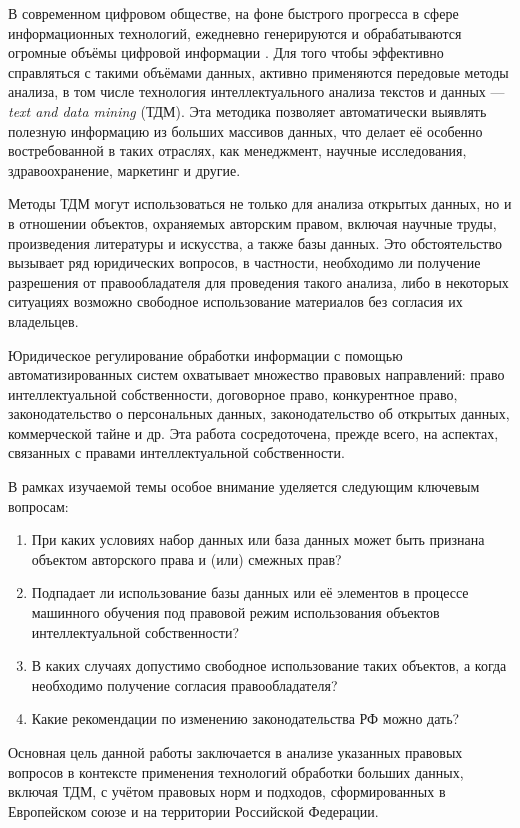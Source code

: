 \introduction

В современном цифровом обществе, на фоне быстрого прогресса в сфере
информационных технологий, ежедневно генерируются и обрабатываются огромные
объёмы цифровой информации \cite{geiger2020tdm}. Для того чтобы эффективно
справляться с такими объёмами данных, активно применяются передовые методы
анализа, в том числе технология интеллектуального анализа текстов и данных ---
\textit{text and data mining} (ТДМ). Эта методика позволяет автоматически
выявлять полезную информацию из больших массивов данных, что делает её особенно
востребованной в таких отраслях, как менеджмент, научные исследования,
здравоохранение, маркетинг и другие.

Методы ТДМ могут использоваться не только для анализа открытых данных, но и в
отношении объектов, охраняемых авторским правом, включая научные труды,
произведения литературы и искусства, а также базы данных. Это обстоятельство
вызывает ряд юридических вопросов, в частности, необходимо ли получение
разрешения от правообладателя для проведения такого анализа, либо в некоторых
ситуациях возможно свободное использование материалов без согласия их
владельцев.

Юридическое регулирование обработки информации с помощью автоматизированных
систем охватывает множество правовых направлений: право интеллектуальной
собственности, договорное право, конкурентное право, законодательство о
персональных данных, законодательство об открытых данных, коммерческой тайне и
др. Эта работа сосредоточена, прежде всего, на аспектах, связанных с правами
интеллектуальной собственности.

В рамках изучаемой темы особое внимание уделяется следующим ключевым вопросам:
\begin{enumerate}
    \item При каких условиях набор данных или база данных может быть признана
          объектом авторского права и (или) смежных прав?
    \item Подпадает ли использование базы данных или её элементов в процессе
          машинного обучения под правовой режим использования объектов
          интеллектуальной собственности?
    \item В каких случаях допустимо свободное использование таких объектов, а
          когда необходимо получение согласия правообладателя?
    \item Какие рекомендации по изменению законодательства РФ можно дать?
\end{enumerate}

Основная цель данной работы заключается в анализе указанных правовых вопросов в
контексте применения технологий обработки больших данных, включая ТДМ, с учётом
правовых норм и подходов, сформированных в Европейском союзе и на территории
Российской Федерации.
